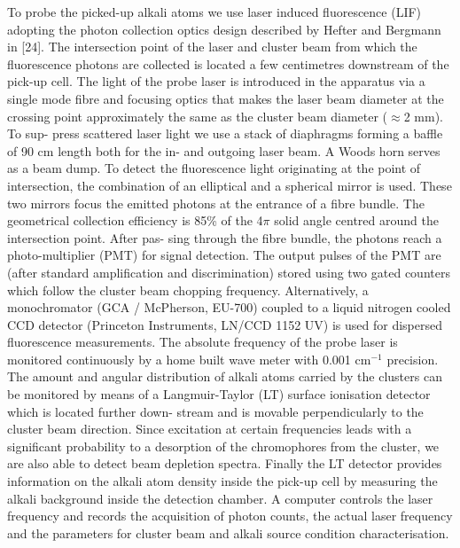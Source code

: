 		To probe the picked-up alkali atoms we use laser induced fluorescence (LIF) adopting the photon collection optics design described by Hefter and Bergmann in [24]. The intersection point of the laser and cluster beam from which the fluorescence photons are collected is located a few centimetres downstream of the pick-up cell. The light of the probe laser is introduced in the apparatus via a single mode fibre and focusing optics that makes the laser beam diameter at the crossing point approximately the same as the cluster beam diameter ($\approx$2 mm). To sup- press scattered laser light we use a stack of diaphragms forming a baffle of 90 cm length both for the in- and outgoing laser beam. A Woods horn serves as a beam dump. To detect the fluorescence light originating at the point of intersection, the combination of an elliptical and a spherical mirror is used. These two mirrors focus the emitted photons at the entrance of a fibre bundle. The geometrical collection efficiency is 85\% of the 4$\pi$ solid angle centred around the intersection point. After pas- sing through the fibre bundle, the photons reach a photo-multiplier (PMT) for signal detection. The output pulses of the PMT are (after standard amplification and discrimination) stored using two gated counters which follow the cluster beam chopping frequency. Alternatively, a monochromator (GCA / McPherson, EU-700) coupled to a liquid nitrogen cooled CCD detector (Princeton Instruments, LN/CCD 1152 UV) is used for dispersed fluorescence measurements. The absolute frequency of the probe laser is monitored continuously by a home built wave meter with 0.001 cm$^{-1}$ precision. The amount and angular distribution of alkali atoms carried by the clusters can be monitored by means of a Langmuir-Taylor (LT) surface ionisation detector which is located further down- stream and is movable perpendicularly to the cluster beam direction. Since excitation at certain frequencies leads with a significant probability to a desorption of the chromophores from the cluster, we are also able to detect beam depletion spectra. Finally the LT detector provides information on the alkali atom density inside the pick-up cell by measuring the alkali background inside the detection chamber. A computer controls the laser frequency and records the acquisition of photon counts, the actual laser frequency and the parameters for cluster beam and alkali source condition characterisation.